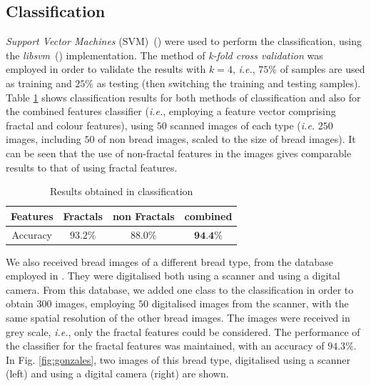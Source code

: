 \documentclass[oneside,a4paper,english,links]{amca}
\begin{document}
\subsection{Classification}
{\em Support Vector Machines} (SVM)~(\cite{Boser92}) were used to perform the classification, using the {\em libsvm}~(\cite{Chang2011}) implementation.
The method of {\em k-fold cross validation} was employed in order to validate the results with $k = 4$, {\em i.e.}, $75\%$ of samples are used as training and $25\%$ as testing (then switching the training and testing samples). Table \ref{table:tableFirstTest} shows classification results for both methods of classification and also for the combined features classifier ({\em i.e.}, employing a feature vector comprising fractal and colour features), using $50$ scanned images of each type ({\em i.e.} $250$ images, including $50$ of non bread images, scaled to the size of bread images). It can be seen that the use of non-fractal features in the images gives comparable results to that of using fractal features.

\begin{table}[htb]
\centering
\begin{tabular}{|c|c|c|c|}
    \hline
    Features & Fractals & non Fractals & combined\\
    \hline
    \hline
    Accuracy  & $93.2\%$ & $88.0\%$ & $\textbf{94.4\%}$\\
    \hline
\end{tabular}
\caption{Results obtained in classification}
\label{table:tableFirstTest}
\end{table}

We also received bread images of a different bread type, from the database employed in \cite{Gonzales2008}. They were digitalised both using a scanner and using a digital camera. From this database, we added one class to the classification in order to obtain $300$ images, employing $50$ digitalised images from the scanner, with the same spatial resolution of the other bread images. The images were received in grey scale, {\em i.e.}, only the fractal features could be considered. The performance of the classifier for the fractal features was maintained, with an accuracy of $94.3\%$. In Fig. \ref{fig:gonzales}, two images of this bread type, digitalised using a scanner (left) and using a digital camera (right) are shown.
\end{document}
